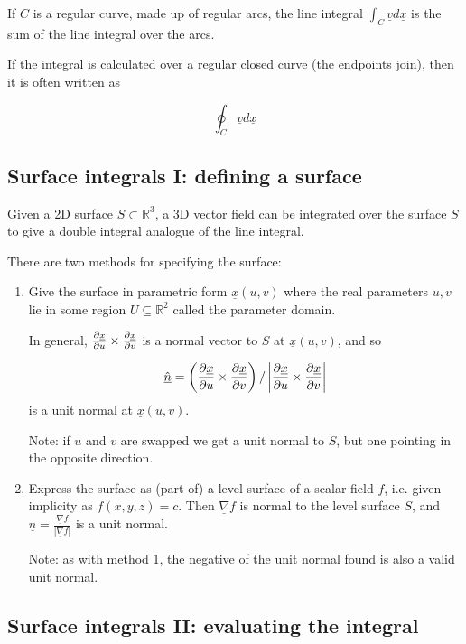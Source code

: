 \documentclass[12pt,a4paper]{article}
\theoremstyle{definition}
\begin{document}
If $C$ is a regular curve, made up of regular arcs, the line integral $\int_C \underline{v} d\underline{x}$ is the sum of the line integral over the arcs.

If the integral is calculated over a regular closed curve (the endpoints join), then it is often written as

\[\oint_C \underline{v} d\underline{x}\]

\subsection{Surface integrals I: defining a surface}


Given a 2D surface $S \subset \mathbb{R}^3$, a 3D vector field can be integrated over the surface $S$ to give a double integral analogue of the line integral.

There are two methods for specifying the surface:

\begin{enumerate}
	\item Give the surface in parametric form $\underline{x}(u, v)$ where the real parameters $u, v$ lie in some region $U \subseteq \mathbb{R}^2$ called the parameter domain.
	
	In general, $\diffp{\underline{x}}{u} \times \diffp{\underline{x}}{v}$ is a normal vector to $S$ at $\underline{x}(u, v)$, and so
	
	\[ \hat{\underline{n}} = \left( \diffp{\underline{x}}{u} \times \diffp{\underline{x}}{v} \right) / \left| \diffp{\underline{x}}{u} \times \diffp{\underline{x}}{v} \right| \] is a unit normal at $\underline{x}(u, v)$.

	Note: if $u$ and $v$ are swapped we get a unit normal to $S$, but one pointing in the opposite direction.
	\item Express the surface as (part of) a level surface of a scalar field $f$, i.e. given implicity as $f(x, y, z) = c$. Then $\underline{\nabla}f$ is normal to the level surface $S$, and $\hat{\underline{n}} = \frac{\underline{\nabla}f}{|\underline{\nabla}f|}$ is a unit normal.
	
	Note: as with method 1, the negative of the unit normal found is also a valid unit normal.
\end{enumerate}

\subsection{Surface integrals II: evaluating the integral}
\end{document}
